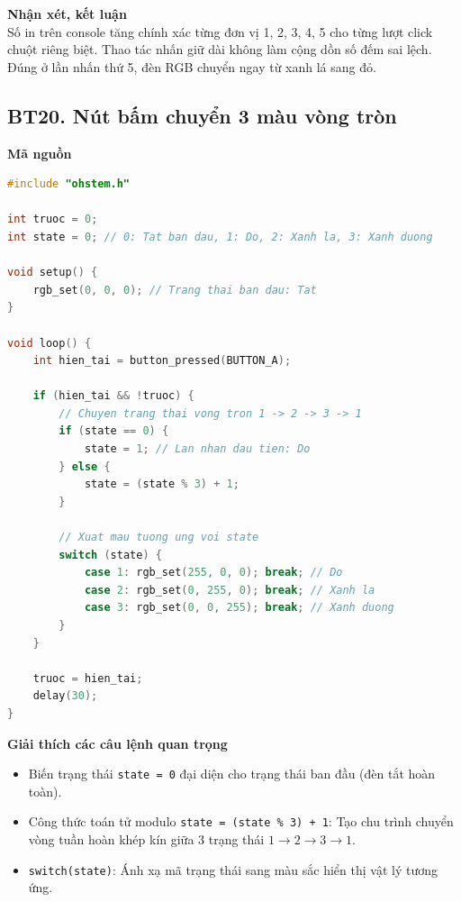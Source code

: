 \noindent\textbf{Nhận xét, kết luận}\\
Số in trên console tăng chính xác từng đơn vị 1, 2, 3, 4, 5 cho từng lượt click chuột riêng biệt. Thao tác nhấn giữ dài không làm cộng dồn số đếm sai lệch. Đúng ở lần nhấn thứ 5, đèn RGB chuyển ngay từ xanh lá sang đỏ.


\subsection*{BT20. Nút bấm chuyển 3 màu vòng tròn}

\noindent\textbf{Mã nguồn}\\
\begin{lstlisting}[language=C]
#include "ohstem.h"

int truoc = 0;
int state = 0; // 0: Tat ban dau, 1: Do, 2: Xanh la, 3: Xanh duong

void setup() {
    rgb_set(0, 0, 0); // Trang thai ban dau: Tat
}

void loop() {
    int hien_tai = button_pressed(BUTTON_A);

    if (hien_tai && !truoc) {
        // Chuyen trang thai vong tron 1 -> 2 -> 3 -> 1
        if (state == 0) {
            state = 1; // Lan nhan dau tien: Do
        } else {
            state = (state % 3) + 1;
        }

        // Xuat mau tuong ung voi state
        switch (state) {
            case 1: rgb_set(255, 0, 0); break; // Do
            case 2: rgb_set(0, 255, 0); break; // Xanh la
            case 3: rgb_set(0, 0, 255); break; // Xanh duong
        }
    }

    truoc = hien_tai;
    delay(30);
}
\end{lstlisting}

\noindent\textbf{Giải thích các câu lệnh quan trọng}\\
\begin{itemize}
    \item Biến trạng thái \texttt{state = 0} đại diện cho trạng thái ban đầu (đèn tắt hoàn toàn).
    \item Công thức toán tử modulo \texttt{state = (state \% 3) + 1}: Tạo chu trình chuyển vòng tuần hoàn khép kín giữa 3 trạng thái $1 \to 2 \to 3 \to 1$.
    \item \texttt{switch(state)}: Ánh xạ mã trạng thái sang màu sắc hiển thị vật lý tương ứng.
\end{itemize}

